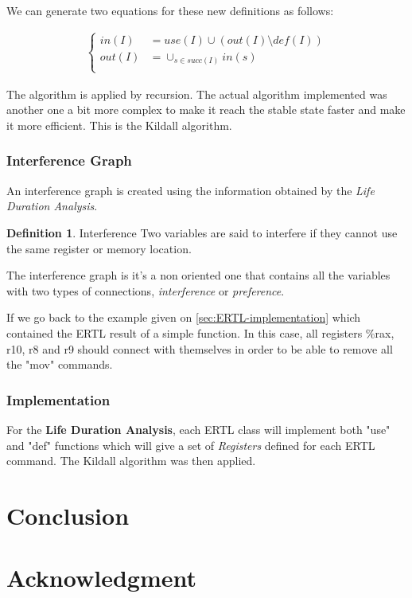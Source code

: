\documentclass[conference]{IEEEtran}
\theoremstyle{definition}
\newtheorem{definition}{Definition}[section]
\begin{document}
We can generate two equations for these new definitions as follows:

\begin{align*}
	\left\{ 
	\begin{array}{cl} 
		in(I) & = use(I) \cup (out(I) \setminus def(I)) \\
		out(I) & = \cup_{s \in succ(I)}in(s) \\
	\end{array}
	\right.
\end{align*}

The algorithm is applied by recursion. The actual algorithm implemented was another one a bit more complex to make it reach the stable state faster and make it more efficient. This is the Kildall algorithm.


\subsubsection{Interference Graph}

An interference graph is created using the information obtained by the \textit{Life Duration Analysis}.

\theoremstyle{definition}
\begin{definition}{Interference}
	Two variables are said to interfere if they cannot use the same register or memory location.
\end{definition}

The interference graph is it's a non oriented one that contains all the variables with two types of connections, \textit{interference} or \textit{preference}.

If we go back to the example given on \ref{sec:ERTL-implementation} which contained the ERTL result of a simple function. In this case, all registers \%rax, r10, r8 and r9 should connect with themselves in order to be able to remove all the "mov" commands.

\subsubsection{Implementation}

For the \textbf{Life Duration Analysis}, each ERTL class will implement both "use" and "def" functions which will give a set of \textit{Registers} defined for each ERTL command.
The Kildall algorithm was then applied.

\section{Conclusion}

\section*{Acknowledgment}

\newpage
{}


\end{document}
